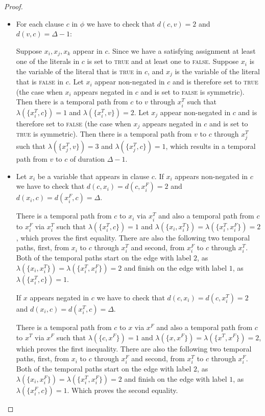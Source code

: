 \documentclass[a4paper,UKenglish,cleveref, autoref, thm-restate, anonymous]{lipics-v2021}
\begin{document}
\begin{proof}
\begin{itemize}
    \item For each clause $c$ in $\phi$ we have to check that $d(c,v)=2$
    and $d(v,c)=\Delta - 1$:

    Suppose $x_i,x_j,x_k$ appear in $c$.
    Since we have a satisfying assignment at least one of the literals in $c$ is set to \textsc{true} and at least one to \textsc{false}. 
    Suppose $x_i$ is the variable of the literal that is \textsc{true} in $c$,
    and $x_j$ is the variable of the literal that is \textsc{false} in $c$.
    Let $x_i$ appear non-negated in $c$ and is therefore set to \textsc{true} (the case when $x_i$ appears negated in $c$ and is set to \textsc{false} is symmetric).
    Then there is a temporal path from $c$ to $v$ through $x_i^T$ such that $\lambda(\{x_i^T, c\})=1$ and $\lambda(\{x_i^T, v\})=2$. 
    Let $x_j$ appear non-negated in $c$ and is therefore set to \textsc{false} 
    (the case when $x_j$ appears negated in $c$ and is set to \textsc{true} is symmetric).
    Then there is a temporal path from $v$ to $c$ through $x_j^T$ such that $\lambda(\{x_j^T, v\})=3$ and $\lambda(\{x_j^T, c\})=1$,
    which results in a temporal path from $v$ to $c$ of duration $\Delta -1$.
    
    \item Let $x_i$ be a variable that appears in clause $c$.
    If $x_i$ appears non-negated in $c$ we have to check that $d(c,x_i)=d(c,x_i^F)=2$
    and $d(x_i,c)=d(x_i^F,c)= \Delta$.

    There is a temporal path from $c$ to $x_i$ via $x_i^T$ and also a temporal path from $c$ to $x_i^F$ via $x_i^T$ such that $\lambda(\{x_i^T, c\})=1$ and $\lambda(\{x_i, x_i^T\})=\lambda(\{x_i^T, x_i^F\})=2$,
    which proves the first equality.
    There are also the following two temporal paths,
    first, from $x_i$ to $c$ through $x_i^T$ and
    second, from $x_i^F$ to $c$ through $x_i^T$.
    Both of the temporal paths start on the edge with label $2$, as 
    $\lambda(\{x_i, x_i^T\}) = \lambda (\{x_i^T, x_i^F\})=2$ and 
    finish on the edge with label $1$, as $\lambda(\{x_i^T, c\}) = 1$.

    If $x$ appears negated in $c$ we have to check that 
    $d(c,x_i)=d(c,x_i^T)=2$
    and $d(x_i,c)=d(x_i^T,c)= \Delta$.

    There is a temporal path from $c$ to $x$ via $x^F$ and also a temporal path from $c$ to $x^T$ via $x^F$ such that $\lambda(\{c, x^F\})=1$ and $\lambda(\{x, x^F\})=\lambda(\{x^T, x^F\})=2$,
    which proves the first inequality.
    There are also the following two temporal paths,
    first, from $x_i$ to $c$ through $x_i^F$ and
    second, from $x_i^T$ to $c$ through $x_i^F$.
    Both of the temporal paths start on the edge with label $2$, as 
    $\lambda(\{x_i, x_i^F\}) = \lambda (\{x_i^T, x_i^F\})=2$ and 
    finish on the edge with label $1$, as $\lambda(\{x_i^F, c\}) = 1$.
    Which proves the second equality.
    

\end{itemize}
\end{proof}
\end{document}
